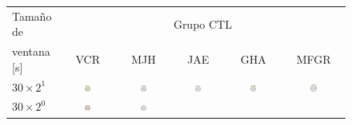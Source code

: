 \begin{figure}
\centering
{\small
\begin{tabular}{lccccc}
\toprule
{\small Tamaño de} & \multicolumn{5}{c}{Grupo CTL} \\
    \cmidrule{2-6}
{\small ventana [s]}    & VCR & MJH & JAE & GHA & MFGR \\
\midrule
$30 \times 2^1$ &
\includegraphics[width=0.13\textwidth]{./img_art_dfa/cabeza_new_VCR_60.pdf} &
\includegraphics[width=0.13\textwidth]{./img_art_dfa/cabeza_new_MJH_60.pdf} &
\includegraphics[width=0.13\textwidth]{./img_art_dfa/cabeza_new_JAE_60.pdf} &
\includegraphics[width=0.13\textwidth]{./img_art_dfa/cabeza_new_GHA_60.pdf} &
\includegraphics[width=0.13\textwidth]{./img_art_dfa/cabeza_new_MFGR_60.pdf} \\
\midrule
$30 \times 2^0$ &
\includegraphics[width=0.13\textwidth]{./img_art_dfa/cabeza_new_VCR_30.pdf} &
\includegraphics[width=0.13\textwidth]{./img_art_dfa/cabeza_new_MJH_30.pdf} &

\end{tabular}}
\end{figure}
